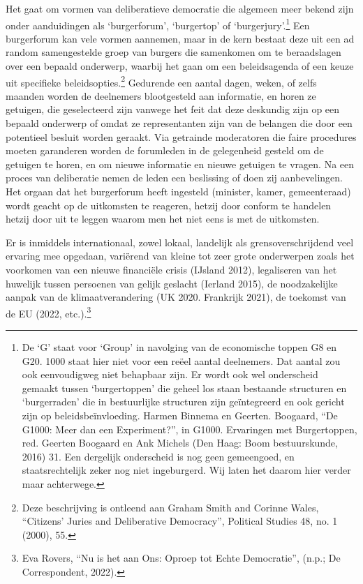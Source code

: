 \documentclass[empirical, authordate, ]{new-jote-article}
\begin{document}
	Het gaat om vormen van deliberatieve democratie die algemeen meer bekend zijn onder aanduidingen als ‘burgerforum', ‘burgertop' of ‘burgerjury'.\footnote{De ‘G' staat voor ‘Group' in navolging van de economische toppen G8 en G20. 1000 staat hier niet voor een reëel aantal deelnemers. Dat aantal zou ook eenvoudigweg niet behapbaar zijn. Er wordt ook wel onderscheid gemaakt tussen ‘burgertoppen' die geheel los staan bestaande structuren en ‘burgerraden' die in bestuurlijke structuren zijn geïntegreerd en ook gericht zijn op beleidsbeïnvloeding. Harmen Binnema en Geerten. Boogaard, “De G1000: Meer dan een Experiment?”, in G1000. Ervaringen met Burgertoppen, red. Geerten Boogaard en Ank Michels (Den Haag: Boom bestuurskunde, 2016) 31. Een dergelijk onderscheid is nog geen gemeengoed, en staatsrechtelijk zeker nog niet ingeburgerd. Wij laten het daarom hier verder maar achterwege.} Een burgerforum kan vele vormen aannemen, maar in de kern bestaat deze uit een ad random samengestelde groep van burgers die samenkomen om te beraadslagen over een bepaald onderwerp, waarbij het gaan om een beleidsagenda of een keuze uit specifieke beleidsopties.\footnote{Deze beschrijving is ontleend aan Graham Smith and Corinne Wales, “Citizens' Juries and Deliberative Democracy”, Political Studies 48, no. 1 (2000), 55.} Gedurende een aantal dagen, weken, of zelfs maanden worden de deelnemers blootgesteld aan informatie, en horen ze getuigen, die geselecteerd zijn vanwege het feit dat deze deskundig zijn op een bepaald onderwerp of omdat ze representanten zijn van de belangen die door een potentieel besluit worden geraakt. Via getrainde moderatoren die faire procedures moeten garanderen worden de forumleden in de gelegenheid gesteld om de getuigen te horen, en om nieuwe informatie en nieuwe getuigen te vragen. Na een proces van deliberatie nemen de leden een beslissing of doen zij aanbevelingen. Het orgaan dat het burgerforum heeft ingesteld (minister, kamer, gemeenteraad) wordt geacht op de uitkomsten te reageren, hetzij door conform te handelen hetzij door uit te leggen waarom men het niet eens is met de uitkomsten.



	Er is inmiddels internationaal, zowel lokaal, landelijk als grensoverschrijdend veel ervaring mee opgedaan, variërend van kleine tot zeer grote onderwerpen zoals het voorkomen van een nieuwe financiële crisis (IJsland 2012), legaliseren van het huwelijk tussen persoenen van gelijk geslacht (Ierland 2015), de noodzakelijke aanpak van de klimaatverandering (UK 2020. Frankrijk 2021), de toekomst van de EU (2022, etc.).\footnote{Eva Rovers, “Nu is het aan Ons: Oproep tot Echte Democratie”, (n.p.; De Correspondent, 2022).}
\end{document}
